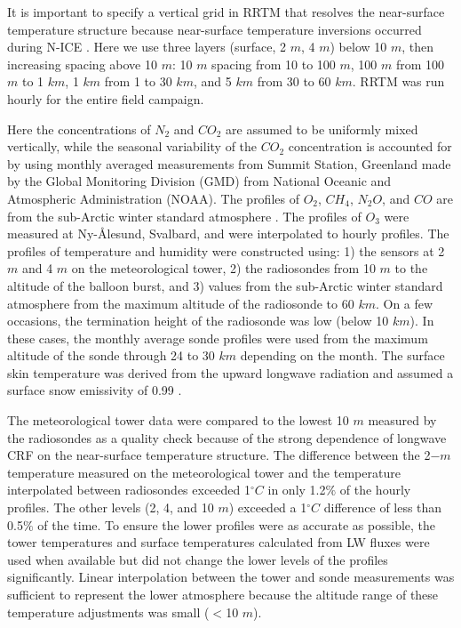  It is important to specify a vertical grid in RRTM that resolves the near-surface temperature structure because near-surface temperature inversions occurred during N-ICE \citep{kayser:2017}. Here we use three layers (surface, 2 $m$, 4 $m$) below 10 $m$, then increasing spacing above 10 $m$: 10 $m$ spacing from 10 to 100 $m$, 100 $m$ from 100 $m$ to 1 $km$, 1 $km$ from 1 to 30 $km$, and 5 $km$ from 30 to 60 $km$. RRTM was run hourly for the entire field campaign.

Here the concentrations of $N_{2}$ and $CO_{2}$ are assumed to be uniformly mixed vertically, while the seasonal variability of the $CO_{2}$ concentration is accounted for by using monthly averaged measurements from Summit Station, Greenland made by the Global Monitoring Division (GMD) from National Oceanic and Atmospheric Administration (NOAA). The profiles of $O_{2}$, $CH_{4}$, $N_{2}O$, and $CO$ are from the sub-Arctic winter standard atmosphere \citep{mcclatchey:1972}. The profiles of $O_{3}$ were measured at Ny-\r{A}lesund, Svalbard, and were interpolated to hourly profiles. The profiles of temperature and humidity were constructed using: 1) the sensors at 2 $m$ and 4 $m$ on the meteorological tower, 2) the radiosondes from 10 $m$ to the altitude of the balloon burst, and 3) values from the sub-Arctic winter standard atmosphere from the maximum altitude of the radiosonde to 60 $km$. On a few occasions, the termination height of the radiosonde was low (below 10 $km$). In these cases, the monthly average sonde profiles were used from the maximum altitude of the sonde through 24 to 30 $km$ depending on the month. The surface skin temperature was derived from the upward longwave radiation \citep{walden:2017} and assumed a surface snow emissivity of 0.99 \citep{persson:2002, grenfell:1999}.

The meteorological tower data were compared to the lowest 10 $m$ measured by the radiosondes as a quality check because of the strong dependence of longwave CRF on the near-surface temperature structure. The difference between the 2$-m$ temperature measured on the meteorological tower and the temperature interpolated between radiosondes exceeded 1$^{\circ}C$ in only 1.2$\%$ of the hourly profiles. The other levels (2, 4, and 10 $m$) exceeded a 1$^{\circ}C$ difference of less than 0.5$\%$ of the time. To ensure the lower profiles were as accurate as possible, the tower temperatures and surface temperatures calculated from LW fluxes were used when available but did not change the lower levels of the profiles significantly. Linear interpolation between the tower and sonde measurements was sufficient to represent the lower atmosphere because the altitude range of these temperature adjustments was small ($<$10 $m$).


